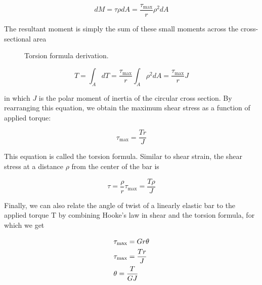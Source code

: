 \documentclass[
10pt,
a4paper,
openany,
svgnames,
]{book} %
\begin{document}
\[dM = \tau \rho dA = \frac{\tau_{\max }}{r}\rho ^2dA\]

The resultant moment is simply the sum of these small moments across the cross-sectional area

\begin{figure}[h]
  \centering
  \caption{Torsion formula derivation.}
\end{figure}

\[T = \int_A {dT}  = \frac{{{\tau _{\max }}}}{r}\int_A {{\rho ^2}dA}  = \frac{{\tau _{\max }}}{r}{J}\]

in which $J$ is the polar moment of inertia of the circular cross section. By rearranging this equation, we obtain the maximum shear stress as a function of applied torque:

\begin{equation} \label{eqn: torsion formula}
  {\tau _{\max }} = \frac{{Tr}}{{{J}}}
\end{equation}

This equation is called the torsion formula. Similar to shear strain, the shear stress at a distance $\rho$ from the center of the bar is

\begin{equation}
  \tau  = \frac{\rho }{r}{\tau _{\max }} = \frac{{T\rho }}{{{J}}}
\end{equation}

Finally, we can also relate the angle of twist of a linearly elastic bar to the applied torque T by combining Hooke’s law in shear and the torsion formula, for which we get

\[\begin{gathered}
    {\tau _{\max }} = Gr\theta \\
    {\tau _{\max }} = \frac{Tr}{J} \hfill \\
    \theta  = \frac{T}{{G{J}}} \hfill \\ 
  \end{gathered} \]
\end{document}
